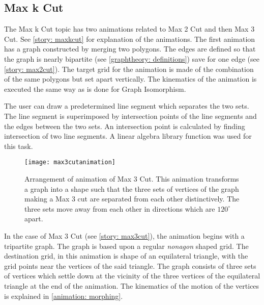 \subsection{Max k Cut}
\label{impl: maxkcut}
The Max k Cut topic has two animations related to Max
2 Cut and then Max 3 Cut. See \autoref{story: maxkcut} for explanation of the
animations. The first animation has a graph constructed by merging two polygons.
The edges are defined so that the graph is nearly bipartite (see
\autoref{graphtheory: definitions}) save for one edge (see \autoref{story:
max2cut}). The target grid for the animation is made of the combination of the
same polygons but set apart vertically. The kinematics of the animation is
executed the same way as is done for Graph Isomorphism.

The user can draw a predetermined line segment which separates the two
sets. The line segment is superimposed by intersection points of the
line segments and the edges between the two sets. An intersection point
is calculated by finding intersection of two line segments. A linear algebra
library function was used for this task.


\begin{figure}[h]
\centering
\texttt{[image: max3cutanimation]}
\caption{
        Arrangement of animation of Max 3 Cut. This animation transforms a graph
        into a shape such that the three sets of vertices of the graph making a Max 3 cut
        are separated from each other distinctively. The three sets move away from each
        other in directions which are $120^{\circ}$ apart.
        }
\label{animationfigure: max3cut}
\end{figure}
In the case of Max 3 Cut (see \autoref{story: max3cut}), the animation begins
with a tripartite graph. The graph is based upon a regular \emph{nonagon}
shaped grid. The destination grid, in this animation is shape of an equilateral
triangle, with the grid points near the vertices of the said triangle. The
graph consists of three sets of vertices which settle down at the vicinity of
the three vertices of the equilateral triangle at the end of the animation. The
kinematics of the motion of the vertices is explained in \autoref{animation:
morphing}.

